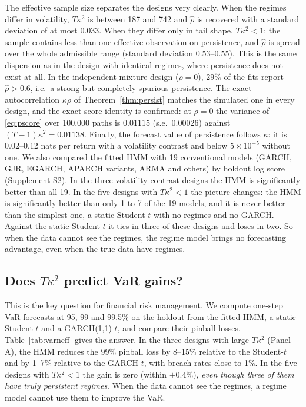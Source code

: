 \documentclass[12pt,letterpaper]{article}
\theoremstyle{plain}
\theoremstyle{remark}
\begin{document}
The effective sample size separates the designs very clearly. When the regimes differ in volatility, $T\kappa^2$ is between 187 and 742 and $\hat\rho$ is recovered with a standard deviation of at most 0.033. When they differ only in tail shape, $T\kappa^2<1$: the sample contains less than one effective observation on persistence, and $\hat\rho$ is spread over the whole admissible range (standard deviation 0.53--0.55). This is the same dispersion as in the design with identical regimes, where persistence does not exist at all. In the independent-mixture design ($\rho=0$), 29\% of the fits report $\hat\rho>0.6$, i.e.\ a strong but completely spurious persistence. The exact autocorrelation $\kappa\rho$ of Theorem~\ref{thm:persist} matches the simulated one in every design, and the exact score identity is confirmed: at $\rho=0$ the variance of \eqref{eq:pscore} over 100{,}000 paths is $0.01115$ (s.e.\ $0.00026$) against $(T-1)\kappa^2=0.01138$. Finally, the forecast value of persistence follows $\kappa$: it is 0.02--0.12 nats per return with a volatility contrast and below $5\times10^{-5}$ without one. We also compared the fitted HMM with 19 conventional models (GARCH, GJR, EGARCH, APARCH variants, ARMA and others) by holdout log score (Supplement S2). In the three volatility-contrast designs the HMM is significantly better than all 19. In the five designs with $T\kappa^2<1$ the picture changes: the HMM is significantly better than only 1 to 7 of the 19 models, and it is never better than the simplest one, a static Student-$t$ with no regimes and no GARCH. Against the static Student-$t$ it ties in three of these designs and loses in two. So when the data cannot see the regimes, the regime model brings no forecasting advantage, even when the true data have regimes.

\subsection{Does \texorpdfstring{$T\kappa^2$}{T kappa squared} predict VaR gains?}
This is the key question for financial risk management. We compute one-step VaR forecasts at 95, 99 and 99.5\% on the holdout from the fitted HMM, a static Student-$t$ and a GARCH(1,1)-$t$, and compare their pinball losses. Table~\ref{tab:varneff} gives the answer. In the three designs with large $T\kappa^2$ (Panel A), the HMM reduces the 99\% pinball loss by 8--15\% relative to the Student-$t$ and by 1--7\% relative to the GARCH-$t$, with breach rates close to 1\%. In the five designs with $T\kappa^2<1$ the gain is zero (within $\pm0.4\%$), \emph{even though three of them have truly persistent regimes}. When the data cannot see the regimes, a regime model cannot use them to improve the VaR.
\end{document}
